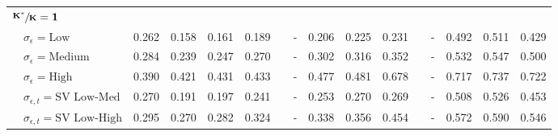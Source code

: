 \begin{table}[!tbp]
\begin{center}
\begin{tabular}{lllllcllllcllll}
\hline
{\bfseries $\mathbf{\sfrac{K^*}{K}=1}$}&&&&&&&&&&&&&&\tabularnewline
~~$\sigma_{\epsilon} =\text{Low}$& 0.262& 0.158& 0.161& 0.189&&-& 0.206& 0.225& 0.231&&-& 0.492& 0.511& 0.429\tabularnewline
~~$\sigma_{\epsilon} =\text{Medium}$& 0.284& 0.239& 0.247& 0.270&&-& 0.302& 0.316& 0.352&&-& 0.532& 0.547& 0.500\tabularnewline
~~$\sigma_{\epsilon} =\text{High}$& 0.390& 0.421& 0.431& 0.433&&-& 0.477& 0.481& 0.678&&-& 0.717& 0.737& 0.722\tabularnewline
~~$\sigma_{\epsilon,t} = \text{SV Low-Med}$& 0.270& 0.191& 0.197& 0.241&&-& 0.253& 0.270& 0.269&&-& 0.508& 0.526& 0.453\tabularnewline
~~$\sigma_{\epsilon,t}  = \text{SV Low-High}$& 0.295& 0.270& 0.282& 0.324&&-& 0.338& 0.356& 0.454&&-& 0.572& 0.590& 0.546\tabularnewline
\hline
\end{tabular}\end{center}
\end{table}
